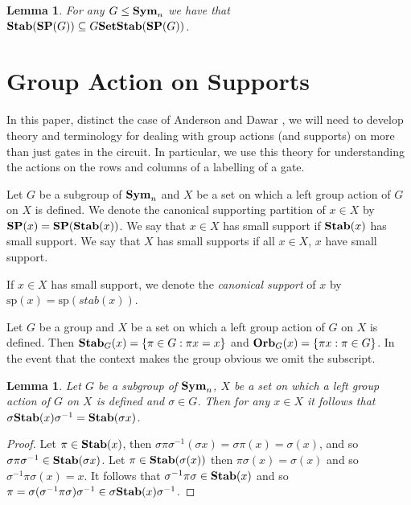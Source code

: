 \documentclass[12pt]{report}
\newtheorem{lem}[thm]{Lemma} \newtheorem{prop}[thm]{Proposition}
\newcommand{\stab}{\text{\textbf{Stab}}}
\newcommand{\setstab}{\text{\textbf{SetStab}}}
\newcommand{\sym}{\text{\textbf{Sym}}}
\newcommand{\orb}{\text{\textbf{Orb}}}
\newcommand{\SP}{\text{\textbf{SP}}}
\newcommand{\consp}{\text{sp}}
\begin{document}
\begin{lem}
  For any $G \leq \sym_n$ we have that $\stab (\SP (G)) \subseteq G
  \setstab(\SP(G))$.
\end{lem}

\section{Group Action on Supports}
In this paper, distinct the case of Anderson and Dawar \cite{AndersonD17}, we
will need to develop theory and terminology for dealing with group actions (and
supports) on more than just gates in the circuit. In particular, we use this
theory for understanding the actions on the rows and columns of a labelling of a
gate.

\begin{definition}
  Let $G$ be a subgroup of $\sym_n$ and $X$ be a set on which a left group
  action of $G$ on $X$ is defined. We denote the canonical supporting partition
  of $x\in X$ by $\SP (x) = \SP (\stab(x))$. We say that $x \in X$ has small
  support if $\stab(x)$ has small support. We say that $X$ has small supports if
  all $x \in X$, $x$ have small support.

  If $x \in X$ has small support, we denote the \emph{canonical support} of $x$
  by $\consp(x) = \consp (stab(x))$.
\end{definition}

\begin{definition}
  Let $G$ be a group and $X$ be a set on which a left group action of $G$ on $X$
  is defined. Then $\stab_G (x) = \{\pi \in G : \pi x = x\}$ and $\orb_G (x) =
  \{\pi x : \pi \in G\}$. In the event that the context makes the group obvious
  we omit the subscript.
\end{definition}

\begin{lem}
  \label{lem:stab_conjugation}
  Let $G$ be a subgroup of $\sym_n$, $X$ be a set on which a left group action
  of $G$ on $X$ is defined and $\sigma \in G$. Then for any $x \in X$ it follows
  that $\sigma \stab (x) \sigma^{-1} = \stab(\sigma x)$.
\end{lem}

\begin{proof}
  Let $\pi \in \stab(x)$, then $\sigma \pi \sigma^{-1}(\sigma x) = \sigma \pi
  (x) = \sigma (x)$, and so $\sigma \pi \sigma^{-1} \in \stab(\sigma x)$. Let
  $\pi \in \stab(\sigma (x))$ then $\pi \sigma (x) = \sigma (x)$ and so
  $\sigma^{-1} \pi \sigma (x) = x$. It follows that $\sigma^{-1} \pi \sigma \in
  \stab(x)$ and so $\pi = \sigma (\sigma^{-1} \pi \sigma) \sigma ^{-1} \in
  \sigma \stab(x) \sigma^{-1}$.
\end{proof}
\end{document}
